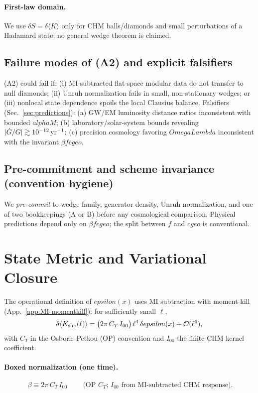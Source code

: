 \documentclass[aps,prd,onecolumn,superscriptaddress,nofootinbib]{revtex4-2}
\def\OmL{OmegaLambda}%
\def\cgeo{cgeo}%
\def\alphaM{alphaM}%
\def\eps{epsilon}%
\def\boxed#1{#1}%
\newcommand{\OmL}{\Omega_\Lambda}
\newcommand{\cgeo}{c_{\rm geo}}
\newcommand{\alphaM}{\alpha_M}
\newcommand{\eps}{\varepsilon}
\begin{document}
\paragraph{First-law domain.} We use $\delta S=\delta\langle K\rangle$ only for CHM balls/diamonds and small perturbations of a Hadamard state; no general wedge theorem is claimed.

\subsection{Failure modes of (A2) and explicit falsifiers}
\label{sec:a2-fail}
(A2) could fail if: (i) MI-subtracted flat-space modular data do not transfer to null diamonds; (ii) Unruh normalization fails in small, non-stationary wedges; or (iii) nonlocal state dependence spoils the local Clausius balance. Falsifiers (Sec.~\ref{sec:predictions}): (a) GW/EM luminosity distance ratios inconsistent with bounded $\alphaM$; (b) laboratory/solar-system bounds revealing $|\dot G/G|\gtrsim 10^{-12}\,{\rm yr}^{-1}$; (c) precision cosmology favoring $\OmL$ inconsistent with the invariant $\beta f \cgeo$.

\subsection{Pre-commitment and scheme invariance (convention hygiene)}
\label{sec:precommit}
We \emph{pre-commit} to wedge family, generator density, Unruh normalization, and one of two bookkeepings (A or B) before any cosmological comparison. Physical predictions depend only on $\beta f \cgeo$; the split between $f$ and $\cgeo$ is conventional.

\section{State Metric and Variational Closure}
\label{sec:state-metric}
The operational definition of $\eps(x)$ uses MI subtraction with moment-kill (App.~\ref{app:MI-momentkill}): for sufficiently small $\ell$,
\begin{equation}
\label{eq:sigma-operational}
\delta\langle K_{\rm sub}(\ell)\rangle = \big(2\pi\, C_T\, I_{00}\big)\,\ell^4\,\delta\eps(x) + \mathcal O(\ell^6),
\end{equation}
with $C_T$ in the Osborn--Petkou (OP) convention and $I_{00}$ the finite CHM kernel coefficient.

\paragraph*{Boxed normalization (one time).}
\begin{equation}
\boxed{\ \beta \equiv 2\pi\, C_T\, I_{00}\ }\qquad
\text{(OP $C_T$; $I_{00}$ from MI-subtracted CHM response).}
\label{eq:beta-box}
\end{equation}
\end{document}
